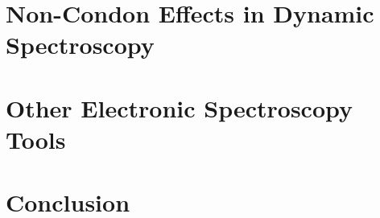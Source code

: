 
\dsp

\hypersetup{pageanchor=false}
\frontmatter

\graphicspath{{NonCondonPaper/images/}{MolmerSorenson/images/}{perspective_science/}{DetectingNonCondonPaper/images/}{HeatingNonCondonPaper/images/}{intro/}{future/}{OtherWork/images/}{conclusion/}}

\clearpage
\hypersetup{pageanchor=true}


\clearpage
\part{Non-Condon Effects in Dynamic Spectroscopy}
\clearpage

\clearpage

\clearpage

\clearpage

\clearpage
\part{Other Electronic Spectroscopy Tools}
\clearpage

\clearpage

\clearpage


\clearpage
\part{Conclusion}
\clearpage

\clearpage
{
\ssp %


}

